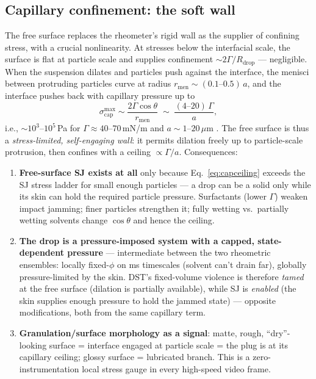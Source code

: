 \documentclass[11pt]{article}
\begin{document}
\subsection{Capillary confinement: the soft wall}
\label{sec:capillary}
The free surface replaces the rheometer's rigid wall as the supplier of confining stress, with a crucial nonlinearity. At stresses below the interfacial scale, the surface is flat at particle scale and supplies confinement $\sim 2\Gamma/R_{\mathrm{drop}}$ --- negligible. When the suspension dilates and particles push against the interface, the menisci between protruding particles curve at radius $r_{\mathrm{men}} \sim (0.1\text{--}0.5)\,a$, and the interface pushes back with capillary pressure up to
\begin{equation}
\sigma_{\mathrm{cap}}^{\max} \sim \frac{2\Gamma \cos\theta}{r_{\mathrm{men}}} \;\sim\; \frac{(4\text{--}20)\,\Gamma}{a},
\label{eq:capceiling}
\end{equation}
i.e., $\sim 10^{3}$--$10^{5}$\,Pa for $\Gamma \approx 40$--$70$\,mN/m and $a \sim 1$--$20\,\mu$m \cite{brown2014,cates2005granulation}. The free surface is thus a \emph{stress-limited, self-engaging wall}: it permits dilation freely up to particle-scale protrusion, then confines with a ceiling $\propto \Gamma/a$. Consequences:
\begin{enumerate}
\item \textbf{Free-surface SJ exists at all} only because Eq.~\eqref{eq:capceiling} exceeds the SJ stress ladder for small enough particles --- a drop can be a solid only while its skin can hold the required particle pressure. Surfactants (lower $\Gamma$) weaken impact jamming; finer particles strengthen it; fully wetting vs.\ partially wetting solvents change $\cos\theta$ and hence the ceiling.
\item \textbf{The drop is a pressure-imposed system with a capped, state-dependent pressure} --- intermediate between the two rheometric ensembles: locally fixed-$\phi$ on ms timescales (solvent can't drain far), globally pressure-limited by the skin. DST's fixed-volume violence is therefore \emph{tamed} at the free surface (dilation is partially available), while SJ is \emph{enabled} (the skin supplies enough pressure to hold the jammed state) --- opposite modifications, both from the same capillary term.
\item \textbf{Granulation/surface morphology as a signal}: matte, rough, ``dry''-looking surface = interface engaged at particle scale = the plug is at its capillary ceiling; glossy surface = lubricated branch. This is a zero-instrumentation local stress gauge in every high-speed video frame.
\end{enumerate}
\end{document}
